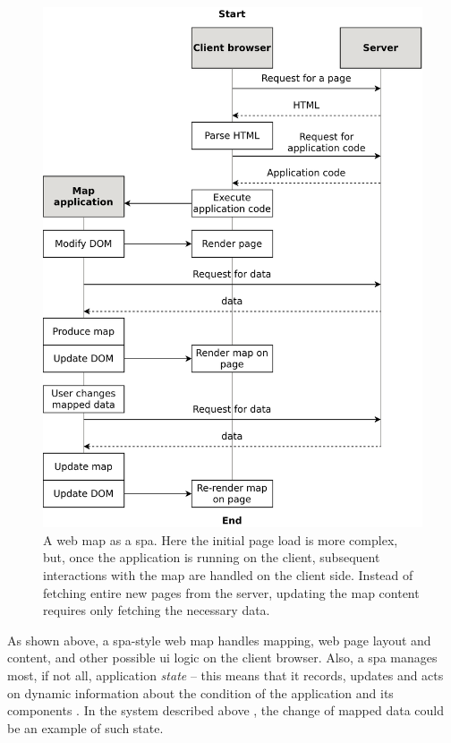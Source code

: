 \begin{figure}[H]
	\centering
	\includegraphics[width=\diagramwidth]{visual/figures/diagrams/spa.png}
	\caption{
		A web map as a \acrshort{spa}. Here the initial page load is more complex,
		but, once the application is running on the client,
		subsequent interactions with the map are handled on the client side.
		Instead of fetching entire new pages from the server,
		updating the map content requires only fetching the necessary data.
	}
	\label{fig:spa}
\end{figure}

As shown above, a \acrshort{spa}-style web map handles mapping,
web page layout and content, and other possible \acrshort{ui} logic
on the client browser.
Also, a \acrshort{spa} manages most, if not all,
application \textit{state} --
this means that it records, updates and acts on dynamic information about
the condition of the application and its components \parencite{fin2014}.
In the system described above ,
the change of mapped data could be an example of such state.

